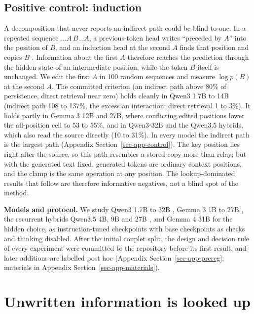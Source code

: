 \documentclass[
]{article}
\begin{document}
\subsection{Positive control: induction}\label{sec-control}

A decomposition that never reports an indirect path could be blind to
one. In a repeated sequence \(\ldots A\,B\ldots A\), a previous-token
head writes ``preceded by \(A\)'' into the position of \(B\), and an
induction head at the second \(A\) finds that position and copies \(B\)
\citep{olsson2022induction}. Information about the first \(A\) therefore
reaches the prediction through the hidden state of an intermediate
position, while the token \(B\) itself is unchanged. We edit the first
\(A\) in 100 random sequences and measure \(\log p(B)\) at the second
\(A\). The committed criterion (an indirect path above 80\% of
persistence, direct retrieval near zero) holds cleanly in Qwen3 1.7B to
14B (indirect path 108 to 137\%, the excess an interaction; direct
retrieval 1 to 3\%). It holds partly in Gemma 3 12B and 27B, where
conflicting edited positions lower the all-position cell to 53 to 55\%,
and in Qwen3-32B and the Qwen3.5 hybrids, which also read the source
directly (10 to 31\%). In every model the indirect path is the largest
path (Appendix Section~\ref{sec-app-control}). The key position lies
right after the source, so this path resembles a stored copy more than
relay; but with the generated text fixed, generated tokens are ordinary
context positions, and the clamp is the same operation at any position.
The lookup-dominated results that follow are therefore informative
negatives, not a blind spot of the method.

\textbf{Models and protocol.} We study Qwen3 1.7B to 32B
\citep{yang2025qwen3}, Gemma 3 1B to 27B \citep{gemma3}, the recurrent
hybrids Qwen3.5 4B, 9B and 27B \citep{qwen2026qwen35}, and Gemma 4 31B
\citep{gemma4} for the hidden choice, as instruction-tuned checkpoints
with base checkpoints as checks and thinking disabled. After the initial
couplet split, the design and decision rule of every experiment were
committed to the repository before its first result, and later additions
are labelled post hoc (Appendix Section~\ref{sec-app-prereg}; materials
in Appendix Section~\ref{sec-app-materials}).

\section{Unwritten information is looked up}\label{sec-lookup}
\end{document}
